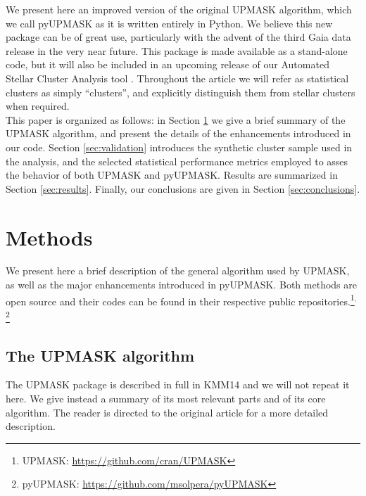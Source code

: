 \documentclass[draft]{aa}
\begin{document}
 We present here an improved version of the original UPMASK algorithm, which we
 call pyUPMASK as it is written entirely in Python. We believe this new package
 can be of great use, particularly with the advent of the third Gaia data
 release in the very near future. This package is made available as a
 stand-alone code, but it will also be included in an upcoming release of our
 Automated Stellar Cluster Analysis tool \citep[\texttt{ASteCA};][]{Perren_2015}.
 Throughout the article we will refer as statistical clusters as simply
 ``clusters'', and explicitly distinguish them from stellar clusters when
 required.\\

 This paper is organized as follows: in Section \ref{sec:methods} we
 give a brief summary of the UPMASK algorithm, and present the details of the
 enhancements introduced in our code. 
 Section \ref{sec:validation} introduces the synthetic cluster sample
 used in the analysis, and the selected statistical performance metrics
 employed to asses the behavior of both UPMASK and pyUPMASK.
 Results are summarized in Section \ref{sec:results}. Finally, our
 conclusions are given in Section \ref{sec:conclusions}.



\section{Methods}
 \label{sec:methods}

 We present here a brief description of the general algorithm used by UPMASK,
 as well as the major enhancements introduced in pyUPMASK.
 Both methods are open source and their codes can be found in their
 respective public repositories.\footnote{UPMASK: 
 \url{https://github.com/cran/UPMASK}}$^{,}$\footnote{pyUPMASK:
 \url{https://github.com/msolpera/pyUPMASK}} %



\subsection{The UPMASK algorithm}
 \label{ssec:upmask}

 The UPMASK package is described in full in KMM14 and we will not repeat it
 here. We give instead a summary of its most relevant parts and of its core
 algorithm. The reader is directed to the original article for a more detailed
 description.\\
 
\end{document}
